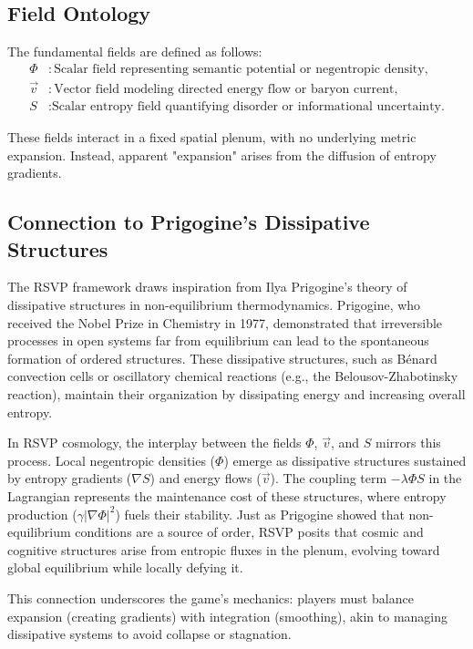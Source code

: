 \documentclass[12pt]{article}
\theoremstyle{definition}
\begin{document}
\subsection{Field Ontology}
The fundamental fields are defined as follows:
\begin{align}
\Phi &: \text{Scalar field representing semantic potential or negentropic density},\\
\vec{v} &: \text{Vector field modeling directed energy flow or baryon current},\\
S &: \text{Scalar entropy field quantifying disorder or informational uncertainty.}
\end{align}

These fields interact in a fixed spatial plenum, with no underlying metric expansion. Instead, apparent "expansion" arises from the diffusion of entropy gradients.

\subsection{Connection to Prigogine's Dissipative Structures}
The RSVP framework draws inspiration from Ilya Prigogine's theory of dissipative structures in non-equilibrium thermodynamics. Prigogine, who received the Nobel Prize in Chemistry in 1977, demonstrated that irreversible processes in open systems far from equilibrium can lead to the spontaneous formation of ordered structures. These dissipative structures, such as Bénard convection cells or oscillatory chemical reactions (e.g., the Belousov-Zhabotinsky reaction), maintain their organization by dissipating energy and increasing overall entropy.

In RSVP cosmology, the interplay between the fields $\Phi$, $\vec{v}$, and $S$ mirrors this process. Local negentropic densities ($\Phi$) emerge as dissipative structures sustained by entropy gradients ($\nabla S$) and energy flows ($\vec{v}$). The coupling term $-\lambda \Phi S$ in the Lagrangian represents the maintenance cost of these structures, where entropy production ($\gamma |\nabla \Phi|^2$) fuels their stability. Just as Prigogine showed that non-equilibrium conditions are a source of order, RSVP posits that cosmic and cognitive structures arise from entropic fluxes in the plenum, evolving toward global equilibrium while locally defying it.

This connection underscores the game's mechanics: players must balance expansion (creating gradients) with integration (smoothing), akin to managing dissipative systems to avoid collapse or stagnation.
\end{document}
